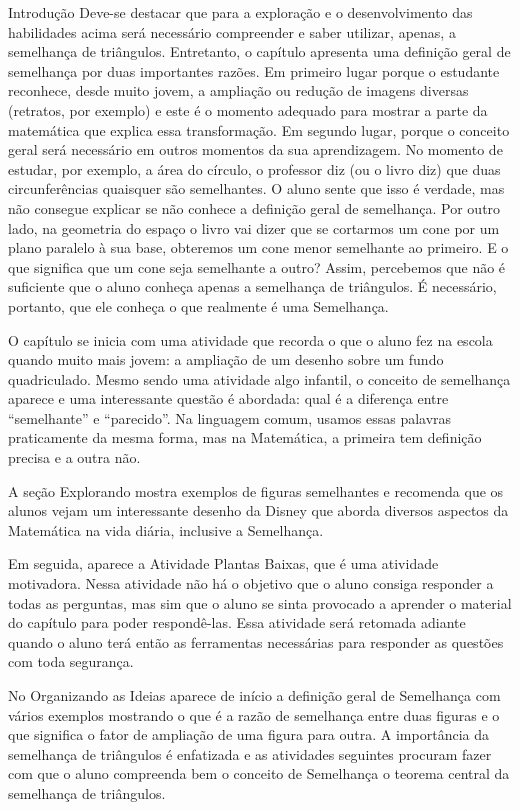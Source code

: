 \begin{apresentacao}{Introdução}
Deve-se destacar que para a exploração e o desenvolvimento das habilidades acima será necessário compreender e saber utilizar, apenas, a semelhança de triângulos. Entretanto, o capítulo apresenta uma definição geral de semelhança por duas importantes razões. Em primeiro lugar porque o estudante reconhece, desde muito jovem, a ampliação ou redução de imagens diversas (retratos, por exemplo) e este é o momento adequado para mostrar a parte da matemática que explica essa transformação. Em segundo lugar, porque o conceito geral será necessário em outros momentos da sua aprendizagem. No momento de estudar, por exemplo, a área do círculo, o professor diz (ou o livro diz) que duas circunferências quaisquer são semelhantes. O aluno sente que isso é verdade, mas não consegue explicar se não conhece a definição geral de semelhança. Por outro lado, na geometria do espaço o livro vai dizer que se cortarmos um cone por um plano paralelo à sua base, obteremos um cone menor semelhante ao primeiro. E o que significa que um cone seja semelhante a outro? Assim, percebemos que não é suficiente que o aluno conheça apenas a semelhança de triângulos. É necessário, portanto, que ele conheça o que realmente é uma Semelhança.

O capítulo se inicia com uma atividade que recorda o que o aluno fez na escola quando muito mais jovem: a ampliação de um desenho sobre um fundo quadriculado. Mesmo sendo uma atividade algo infantil, o conceito de semelhança aparece e uma interessante questão é abordada: qual é a diferença entre “semelhante” e “parecido”. Na linguagem comum, usamos essas palavras praticamente da mesma forma, mas na Matemática, a primeira tem definição precisa e a outra não.

A seção Explorando mostra exemplos de figuras semelhantes e recomenda que os alunos vejam um interessante desenho da Disney que aborda diversos aspectos da Matemática na vida diária, inclusive a Semelhança.

Em seguida, aparece a Atividade Plantas Baixas, que é uma atividade motivadora. Nessa atividade não há o objetivo que o aluno consiga responder a todas as perguntas, mas sim que o aluno se sinta provocado a aprender o material do capítulo para poder respondê-las. Essa atividade será retomada adiante quando o aluno terá então as ferramentas necessárias para responder as questões com toda segurança.

No Organizando as Ideias aparece de início a definição geral de Semelhança com vários exemplos mostrando o que é a razão de semelhança entre duas figuras e o que significa o fator de ampliação de uma figura para outra. A importância da semelhança de triângulos é enfatizada e as atividades seguintes procuram fazer com que o aluno compreenda bem o conceito de Semelhança o teorema central da semelhança de triângulos.


\end{apresentacao}
